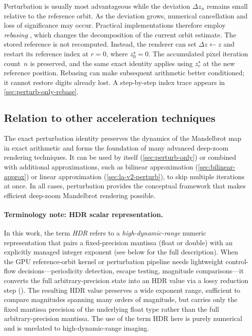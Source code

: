 Perturbation is usually most advantageous while the deviation \(\Delta z_n\) remains
small relative to the reference orbit. As the deviation grows, numerical
cancellation and loss of significance may occur. Practical implementations
therefore employ \emph{rebasing} \cite{Zhuoran2023ReferenceCompression,HeilandAllen2022DeepZoom},
which changes the decomposition of the current orbit estimate. The stored
reference is not recomputed. Instead, the renderer can set
$\Delta z\leftarrow z$ and restart its reference index at $r=0$, where
$z_0^\star=0$. The accumulated pixel iteration count~$n$ is preserved, and the
same exact identity applies using $z_r^\star$ at the new reference position.
Rebasing can make subsequent arithmetic better conditioned; it cannot restore
digits already lost. A step-by-step index trace appears in
\cref{sec:perturb-only-rebase}.

\subsection{Relation to other acceleration techniques}

The exact perturbation identity preserves the dynamics of the Mandelbrot map
in exact arithmetic and forms the
foundation of many advanced deep-zoom rendering techniques. It can be used by
itself (\cref{sec:perturb-only}) or combined with additional approximations, such as bilinear approximation
(\cref{sec:bilinear-approx}) or linear approximation (\cref{sec:la-v2-perturb}),
to skip multiple iterations at once. In all cases, perturbation provides
the conceptual framework that makes efficient deep-zoom Mandelbrot rendering
possible.

\paragraph{Terminology note: HDR scalar representation.}
In this work, the term \emph{HDR} refers to a \emph{high-dynamic-range} numeric
representation that pairs a fixed-precision mantissa (float or double) with an
explicitly managed integer exponent (see below for the full description).  When the GPU reference-orbit kernel or
perturbation pipeline needs lightweight control-flow decisions---periodicity
detection, escape testing, magnitude comparisons---it converts the full
arbitrary-precision state into an HDR value via a lossy reduction step
().  The resulting HDR value preserves a wide exponent range,
sufficient to compare magnitudes spanning many orders of magnitude, but carries
only the fixed mantissa precision of the underlying float type rather than the
full arbitrary-precision mantissa.  The use of the term HDR here is purely
numerical and is unrelated to high-dynamic-range imaging.
